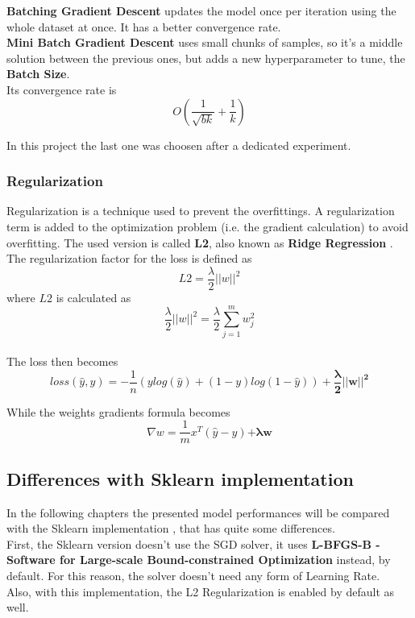 \documentclass[
	letterpaper, %
	10pt, %
]{class}
\begin{document}
\textbf{Batching Gradient Descent} updates the model once per iteration using the whole dataset at once. It has a better convergence rate.\\

\textbf{Mini Batch Gradient Descent} \cite{batching} uses small chunks of samples, so it's a middle solution between the previous ones, but adds a new hyperparameter to tune, the \textbf{Batch Size}.\\
Its convergence rate is
$$O(\frac{1}{\sqrt{bk}} + \frac{1}{k})$$

In this project the last one was choosen after a dedicated experiment.

\subsubsection{Regularization}
Regularization is a technique used to prevent the overfittings. A regularization term is added to the optimization problem (i.e. the gradient calculation) to avoid overfitting.
The used version is called \textbf{L2}, also known as \textbf{Ridge Regression} \cite{l2}.\\

The regularization factor for the loss is defined as
$$ L2 = \frac{\lambda}{2}||w||^2 $$
where $L2$ is calculated as
$$ \frac{\lambda}{2}||w||^2 = \frac{\lambda}2{\displaystyle\sum_{j=1}^m w_j^2} $$ \\

The loss then becomes
$$ loss(\hat{y}, y) = -\frac{1}{n}(y log(\hat{y}) + (1-y)log(1-\hat{y})) + \boldsymbol{\frac{\lambda}{2}||w||^2} $$

While the weights gradients formula becomes
$$ \nabla w = \frac{1}{m}x^T(\hat{y} - y) \boldsymbol{+ \lambda w} $$

\subsection{Differences with Sklearn implementation}

In the following chapters the presented model performances will be compared with the Sklearn implementation \cite{logisticsklearn}, that has quite some differences.\\
First, the Sklearn version doesn't use the SGD solver, it uses \textbf{L-BFGS-B - Software for Large-scale Bound-constrained Optimization} \cite{lbfgsb} instead, by default.
For this reason, the solver doesn't need any form of Learning Rate.\\
Also, with this implementation, the L2 Regularization is enabled by default as well.
\end{document}
